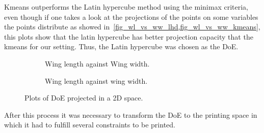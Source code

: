 Kmeans outperforms the Latin hypercube method using the minimax criteria, even
though if one takes a look at the projections of the points on some variables
the points distribute as showed in~\cref{fig_wl_vs_ww_lhd,fig_wl_vs_ww_kmeans},
this plots show that the latin hypercube has better projection capacity that the
kmeans for our setting. Thus, the Latin hypercube was chosen as the DoE.

\begin{figure}
	\begin{subfigure}[h]{.5\linewidth}
		
		\caption{Wing length against Wing width.}
		\label{fig_wl_vs_ww_lhd}
	\end{subfigure}
	\begin{subfigure}[h]{.5\linewidth}
		
		\caption{Wing length against wing width.}
		\label{fig_wl_vs_ww_kmeans}
	\end{subfigure}
	\caption{Plots of DoE projected in a 2D space.}
\end{figure}

After this process it was necessary to transform the DoE to the printing space in which it had to fulfill several constraints to be printed.